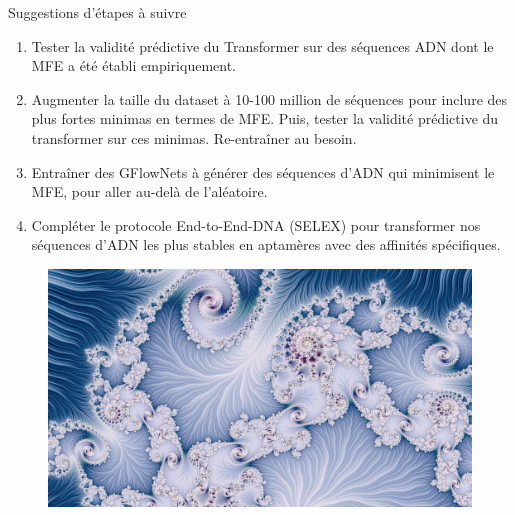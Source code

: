 \documentclass{beamer}
\begin{document}
\begin{frame}{Suggestions d'étapes à suivre}
\begin{enumerate}
    \item Tester la validité prédictive du Transformer sur des séquences ADN dont le MFE a été établi empiriquement.
    \item Augmenter la taille du dataset à 10-100 million de séquences pour inclure des plus fortes minimas en termes de MFE. Puis, tester la validité prédictive du transformer sur ces minimas. Re-entraîner au besoin.
    \item Entraîner des GFlowNets à générer des séquences d'ADN qui minimisent le MFE, pour aller au-delà de l'aléatoire.
    \item Compléter le protocole End-to-End-DNA (SELEX) pour transformer nos séquences d'ADN les plus stables en aptamères avec des affinités spécifiques.
\end{enumerate}

\end{frame}

\begin{frame}

\begin{figure} \label{fig:fractal}
    \center
    \includegraphics[width=1\textwidth]{images/Fractal.jpg}
\end{figure}

\end{frame}
\end{document}
